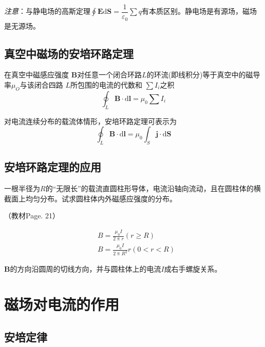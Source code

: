 \documentclass[
	12pt, %
	a4paper, %
]{myLegrandOrangeBook}
\newcommand{\rmd}{\mathrm{d}}
\begin{document}
\emph{注意}：与静电场的高斯定理$\oint \mathbf{E} \rmd \mathbf{S} = \dfrac{1}{\varepsilon_0} \sum q$有本质区别。静电场是有源场，磁场是无源场。

\subsection{真空中磁场的安培环路定理}

\begin{theorem}[真空中磁场的安培环路定理]
在真空中磁感应强度 $\mathbf{B}$对任意一个闭合环路$L$的环流(即线积分)等于真空中的磁导率$\mu_ O $与该闭合四路 $L $所包围的电流的代数和 $\sum I_ i$之积
\begin{equation}
    \oint_L \mathbf{B} \cdot \rmd \mathbf{l} = \mu_0 \sum I_i
\end{equation}
\end{theorem}

对电流连续分布的载流体情形，安培环路定理可表示为
\begin{equation}
    \oint_L \mathbf{B} \cdot \rmd \mathbf{l} = \mu_0 \int_S \mathbf{j} \cdot \rmd \mathbf{S}
\end{equation}

\subsection{安培环路定理的应用}

一根半径为\(R\)的“无限长”的载流直圆柱形导体，电流沿轴向流动，且在圆柱体的横截面上均匀分布。试求圆柱体内外磁感应强度的分布。

（教材Page. 21）

\begin{equation*}
    \begin{aligned}
        & B = \frac{\mu_0 I}{2 \uppi r} (r \geq R) \\
        & B = \frac{\mu_0 I}{2 \uppi R^2} r (0 < r < R)
    \end{aligned}
\end{equation*}

\(\boldsymbol{B}\)的方向沿圆周的切线方向，并与圆柱体上的电流\(I\)成右手螺旋关系。

\section{磁场对电流的作用}

\subsection{安培定律}
\end{document}
